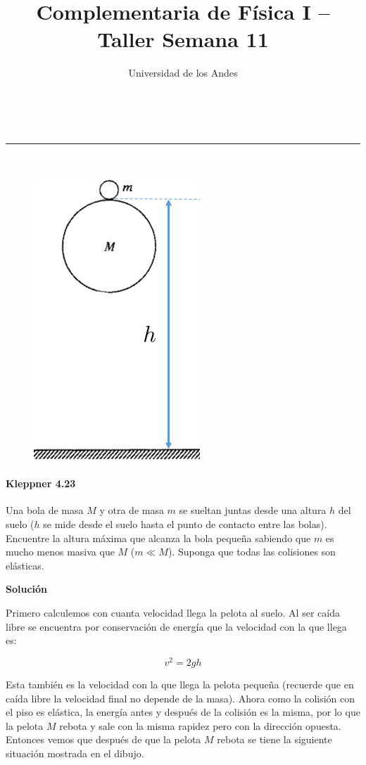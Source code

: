 \documentclass[a4paper,11pt]{article}
\makeatletter
\newcommand{\linia}{\rule{\linewidth}{0.5pt}}
\theoremstyle{mytheor}
\renewcommand{\maketitle}{
\begin{center}
\vspace{2ex}
{\huge \textsc{\@title}}
\vspace{1ex}
\\
\linia\\
\@author \hfill \@date
\vspace{4ex}
\end{center}
}
\makeatother
\begin{document}
\title{Complementaria de Física I -- Taller Semana 11}

\author{Universidad de los Andes}

\date{}

\maketitle

\color{blue}




\begin{figure}[h]
	\includegraphics[width=.2\linewidth]{1}
	\label{fcN4}
\end{figure}



\color{blue}
\paragraph{Kleppner 4.23} Una bola de masa $M$ y otra de masa $m$ se sueltan juntas desde una altura $h$ del suelo ($h$ se mide desde el suelo hasta el punto de contacto entre las bolas). Encuentre la altura máxima que alcanza la bola pequeña sabiendo que $m$ es mucho menos masiva que $M$ ($m\ll M$). Suponga que todas las colisiones son elásticas.




\color{black}

\textbf{Solución}

Primero calculemos con cuanta velocidad llega la pelota al suelo. Al ser caída libre se encuentra por conservación de energía que la velocidad con la que llega es:

$$v^2 = 2gh$$


Esta también es la velocidad con la que llega la pelota pequeña (recuerde que en caída libre la velocidad final no depende de la masa). Ahora como la colisión con el piso es elástica, la energía antes y después de la colisión es la misma, por lo que la pelota $M$ rebota y sale con la misma rapidez pero con la dirección opuesta. Entonces vemos que después de que la pelota $M$ rebota se tiene la siguiente situación mostrada en el dibujo.
\end{document}
